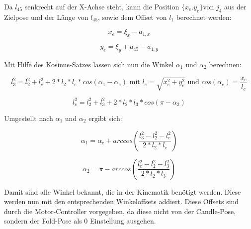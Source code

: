 Da $l_{45}$ senkrecht auf der X-Achse steht, kann die Position $\{x_{e}. y_{e}\}$von $j_4$ aus der Zielpose und der Länge von $l_45$, sowie dem Offset von $l_ {1}$ berechnet werden:

\begin{equation}
x_{e} = \xi_{x} - a_{1,x}
\label{eq:9}
\end{equation}

\begin{equation}
y_{e} = \xi_{y} + a_{45} - a_{1,y}
\label{eq:10}
\end{equation}

Mit Hilfe des Kosinus-Satzes lassen sich nun die Winkel $\alpha_1$ und $\alpha_2$ berechnen:

\begin{equation}
l_3^2 = l_2^2 + l_{e}^2 + 2 * l_2 * l_{e} * cos(\alpha_1 - \alpha_{e}) \text{ mit } l_{e} = \sqrt{x_{e}^2 + y_{e}^2} \text{ und } cos(\alpha_e) = \dfrac{x_{e}}{l_{e}}
\label{eq:11}
\end{equation}


\begin{equation}
l_{e}^2 = l_2^2 + l_3^2 + 2 * l_2 * l_3 * cos(\pi - \alpha_2)
\label{eq:12}
\end{equation}

Umgestellt nach $\alpha_1$ und $\alpha_2$ ergibt sich:

\begin{equation}
\alpha_1 = \alpha_{e} + arccos(\dfrac{l_3^2-l_2^2-l_{e}^2}{2*l_2*l_{e}})
\label{eq:13}
\end{equation}

\begin{equation}
\alpha_2 = \pi - arccos(\dfrac{l_{e}^2-l_2^2-l_{3}^2}{2*l_2*l_3})
\label{eq:14}
\end{equation}

Damit sind alle Winkel bekannt, die in der Kinematik benötigt werden. Diese werden nun mit den entsprechenden Winkeloffsets addiert. Diese Offsets sind durch die Motor-Controller vorgegeben, da diese nicht von der Candle-Pose, sondern der Fold-Pose als 0\textdegree{ } Einstellung ausgehen.

